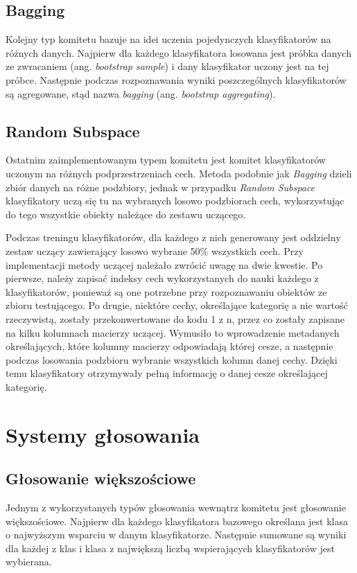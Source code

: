 \documentclass[11pt, a4paper, titlepage]{report}
\begin{document}
\subsection{Bagging}
Kolejny typ komitetu bazuje na idei uczenia pojedynczych klasyfikatorów na różnych danych. Najpierw dla każdego klasyfikatora losowana jest próbka danych ze zwracaniem (ang. \textit{bootstrap sample}) i dany klasyfikator uczony jest na tej próbce. Następnie podczas rozpoznawania wyniki poszczególnych klasyfikatorów są agregowane, stąd nazwa \textit{bagging} (ang. \textit{bootstrap aggregating}).
\subsection{Random Subspace}
Ostatnim zaimplementowanym typem komitetu jest komitet klasyfikatorów uczonym na różnych podprzestrzeniach cech. Metoda podobnie jak \textit{Bagging} dzieli zbiór danych na różne podzbiory, jednak w przypadku \textit{Random Subspace} klasyfikatory uczą się tu na wybranych losowo podzbiorach cech, wykorzystując do tego wszystkie obiekty należące do zestawu uczącego.

Podczas treningu klasyfikatorów, dla każdego z nich generowany jest oddzielny zestaw uczący zawierający losowo wybrane 50\% wszystkich cech. Przy implementacji metody uczącej należało zwrócić uwagę na dwie kwestie. Po pierwsze, należy zapisać indeksy cech wykorzystanych do nauki każdego z klasyfikatorów, ponieważ są one potrzebne przy rozpoznawaniu obiektów ze zbioru testującego. Po drugie, niektóre cechy, określające kategorię a nie wartość rzeczywistą, zostały przekonwertowane do kodu 1 z n, przez co zostały zapisane na kilku kolumnach macierzy uczącej. Wymusiło to wprowadzenie metadanych określających, które kolumny macierzy odpowiadają której cesze, a następnie podczas losowania podzbioru wybranie wszystkich kolumn danej cechy. Dzięki temu klasyfikatory otrzymywały pełną informację o danej cesze określającej kategorię.


\section{Systemy głosowania}
\subsection{Głosowanie większościowe}
Jednym z wykorzystanych typów głosowania wewnątrz komitetu jest głosowanie większościowe. Najpierw dla każdego klasyfikatora bazowego określana jest klasa o najwyższym wsparciu w danym klasyfikatorze. Następnie sumowane są wyniki dla każdej z klas i klasa z największą liczbą wspierających klasyfikatorów jest wybierana.
\end{document}
